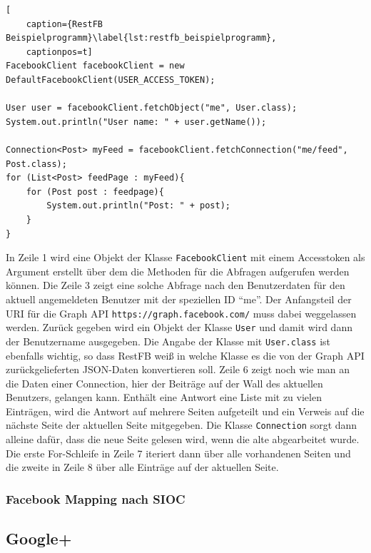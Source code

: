 \begin{lstlisting}[
    caption={RestFB Beispielprogramm}\label{lst:restfb_beispielprogramm},
    captionpos=t]
FacebookClient facebookClient = new DefaultFacebookClient(USER_ACCESS_TOKEN);

User user = facebookClient.fetchObject("me", User.class);
System.out.println("User name: " + user.getName());

Connection<Post> myFeed = facebookClient.fetchConnection("me/feed", Post.class);
for (List<Post> feedPage : myFeed){
    for (Post post : feedpage){
        System.out.println("Post: " + post);
    }
}
\end{lstlisting} 

In Zeile 1 wird eine Objekt der Klasse \texttt{FacebookClient} mit einem Accesstoken als Argument erstellt über dem die Methoden für die Abfragen aufgerufen werden können. Die Zeile 3 zeigt eine solche Abfrage nach den Benutzerdaten für den aktuell angemeldeten Benutzer mit der speziellen ID \enquote{me}. Der Anfangsteil der URI für die Graph API \texttt{https://graph.facebook.com/} muss dabei weggelassen werden. Zurück gegeben wird ein Objekt der Klasse \texttt{User} und damit wird dann der Benutzername ausgegeben. Die Angabe der Klasse mit \texttt{User.class} ist ebenfalls wichtig, so dass RestFB weiß in welche Klasse es die von der Graph API zurückgelieferten JSON-Daten konvertieren soll. Zeile 6 zeigt noch wie man an die Daten einer Connection, hier der Beiträge auf der Wall des aktuellen Benutzers, gelangen kann. Enthält eine Antwort eine Liste mit zu vielen Einträgen, wird die Antwort auf mehrere Seiten aufgeteilt und ein Verweis auf die nächste Seite der aktuellen Seite mitgegeben. Die Klasse \texttt{Connection} sorgt dann alleine dafür, dass die neue Seite gelesen wird, wenn die alte abgearbeitet wurde. Die erste For-Schleife in Zeile 7 iteriert dann über alle vorhandenen Seiten und die zweite in Zeile 8 über alle Einträge auf der aktuellen Seite.


\subsubsection{Facebook Mapping nach SIOC} %
\label{ssub:facebook_mapping_nach_sioc}



\subsection{Google+} %
\label{sub:google_plus_connector}

